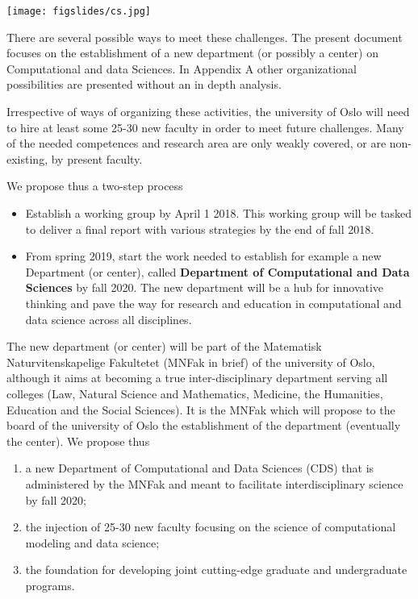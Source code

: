 \documentclass[%
oneside,                 %
final,                   %
10pt]{article}
\begin{document}
\centerline{\texttt{[image: figslides/cs.jpg]}}

\vspace{6mm}



There are several possible ways to meet these challenges. The present document
focuses on the establishment of a new department (or possibly a center) on Computational and data Sciences. In Appendix A other organizational possibilities are presented without an in depth analysis. 

Irrespective of ways of organizing these activities, the university of
Oslo will need to hire at least some 25-30 new faculty in order to
meet future challenges. Many of the needed competences and research
area are only weakly covered, or are non-existing, by present faculty.

We propose thus a two-step process
\begin{itemize}
\item Establish a working group by April 1 2018. This working group  will be tasked to deliver a final report with various strategies  by the end of fall 2018.

\item From spring 2019, start the work needed to establish for example a new Department (or center), called \textbf{Department of Computational and Data Sciences} by fall 2020. The new department will be a hub for innovative thinking and pave the way for research and education in computational and data science across all disciplines. 
\end{itemize}

\noindent
The new department (or center) will be part of the
Matematisk Naturvitenskapelige Fakultetet (MNFak in brief) of the university of Oslo,
although it aims at becoming a true inter-disciplinary department
serving all colleges (Law, Natural Science and Mathematics, Medicine,
the Humanities, Education and the Social Sciences). It is the MNFak
which will propose to the board of the university of Oslo the
establishment of the department (eventually the center).  We propose thus
\begin{enumerate}
\item a new Department of Computational and Data Sciences (CDS) that is administered by the MNFak and meant to facilitate interdisciplinary science by fall 2020;

\item the injection of 25-30 new faculty  focusing on the science of computational modeling and data science;

\item the foundation for developing joint cutting-edge graduate and undergraduate programs. 
\end{enumerate}
\end{document}
